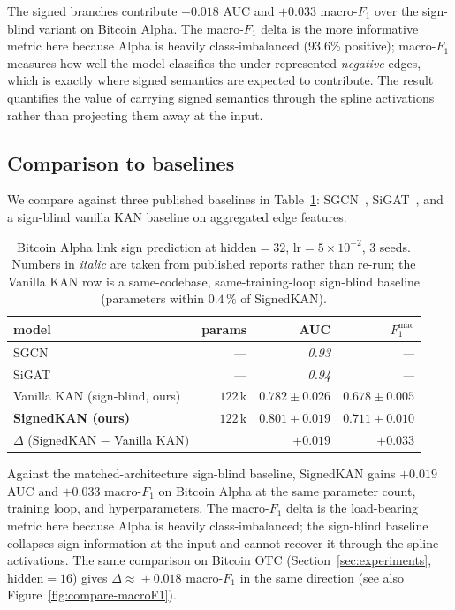 The signed branches contribute $+0.018$ AUC and $+0.033$ macro-$F_1$
over the sign-blind variant on Bitcoin Alpha. The macro-$F_1$ delta
is the more informative metric here because Alpha is heavily
class-imbalanced (93.6\% positive); macro-$F_1$ measures how well the
model classifies the under-represented \emph{negative} edges, which is
exactly where signed semantics are expected to contribute. The result
quantifies the value of carrying signed semantics through the spline
activations rather than projecting them away at the input.

\subsection{Comparison to baselines}

We compare against three published baselines in
Table~\ref{tab:baselines}:
SGCN~\cite{derr2018sgcn},
SiGAT~\cite{huang2019sigat}, and a sign-blind vanilla KAN baseline
on aggregated edge features.

\begin{table}[t]
\centering
\caption{Bitcoin Alpha link sign prediction at hidden$=32$,
lr$=5\!\times\!10^{-2}$, 3 seeds. Numbers in \textit{italic} are
taken from published reports rather than re-run; the Vanilla KAN
row is a same-codebase, same-training-loop sign-blind baseline
(parameters within $0.4\,\%$ of SignedKAN).}
\label{tab:baselines}
\setlength{\tabcolsep}{4pt}
\begin{tabular}{lrrr}
\toprule
model & params & AUC & $F_{1}^{\mathrm{mac}}$ \\
\midrule
SGCN~\cite{derr2018sgcn}              & ---       & \textit{0.93}    & \textit{---}    \\
SiGAT~\cite{huang2019sigat}           & ---       & \textit{0.94}    & \textit{---}    \\
Vanilla KAN (sign-blind, ours)        & $122$\,k  & $0.782\pm0.026$  & $0.678\pm0.005$ \\
\textbf{SignedKAN (ours)}             & $122$\,k  & $\mathbf{0.801\pm0.019}$ & $\mathbf{0.711\pm0.010}$ \\
\midrule
$\Delta$ (SignedKAN $-$ Vanilla KAN)  &           & $\boldsymbol{+0.019}$    & $\boldsymbol{+0.033}$    \\
\bottomrule
\end{tabular}
\end{table}

Against the matched-architecture sign-blind baseline, SignedKAN
gains $+0.019$ AUC and $+0.033$ macro-$F_1$ on Bitcoin Alpha at
the same parameter count, training loop, and hyperparameters.
The macro-$F_1$ delta is the load-bearing metric here because
Alpha is heavily class-imbalanced; the sign-blind baseline
collapses sign information at the input and cannot recover it
through the spline activations. The same comparison on Bitcoin
OTC (Section~\ref{sec:experiments}, hidden$=16$) gives
$\Delta\!\approx\!+0.018$ macro-$F_1$ in the same direction
(see also Figure~\ref{fig:compare-macroF1}).

